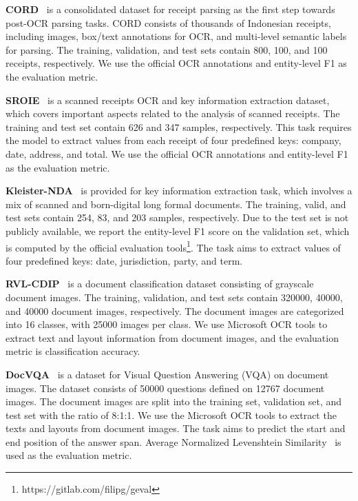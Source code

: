 \documentclass[11pt]{article}
\begin{document}
\textbf{CORD}~\cite{park2019cord} is a consolidated dataset for receipt parsing as the first step towards post-OCR parsing tasks. CORD consists of thousands of Indonesian receipts, including images, box/text annotations for OCR, and multi-level semantic labels for parsing. The training, validation, and test sets contain 800, 100, and 100 receipts, respectively. We use the official OCR annotations and entity-level F1 as the evaluation metric.

\textbf{SROIE}~\cite{huang2019icdar2019} is a scanned receipts OCR and key information extraction dataset, which covers important aspects related to the analysis of scanned receipts. The training and test set contain 626 and 347 samples, respectively. This task requires the model to extract values from each receipt of four predefined keys: company, date, address, and total. We use the official OCR annotations and entity-level F1 as the evaluation metric. 

\textbf{Kleister-NDA}~\cite{gralinski2021kleister} is provided for key information extraction task, which involves a mix of scanned and born-digital long formal documents. The training, valid, and test sets contain 254, 83, and 203 samples, respectively. Due to the test set is not publicly available, we report the entity-level F1 score on the validation set, which is computed by the official evaluation tools\footnote{https://gitlab.com/filipg/geval}. The task aims to extract values of four predefined keys: date, jurisdiction, party, and term. 

\textbf{RVL-CDIP}~\cite{harley2015evaluation} is a document classification dataset consisting of grayscale document images. The training, validation, and test sets contain 320000, 40000, and 40000 document images, respectively. The document images are categorized into 16 classes, with 25000 images per class. We use Microsoft OCR tools to extract text and layout information from document images, and the evaluation metric is classification accuracy. 

\textbf{DocVQA}~\cite{mathew2021docvqa} is a dataset for Visual Question Answering (VQA) on document images. The dataset consists of 50000 questions defined on 12767 document images. The document images are split into the training set, validation set, and test set with the ratio of 8:1:1. We use the Microsoft OCR tools to extract the texts and layouts from document images. 
The task aims to predict the start and end position of the answer span. Average Normalized Levenshtein Similarity~\cite{biten2019icdar} is used as the evaluation metric. 
\end{document}
